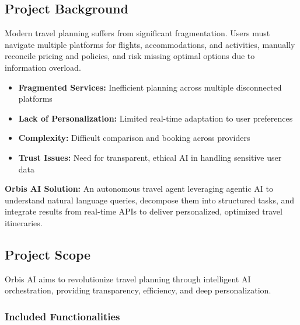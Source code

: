 \documentclass[12pt,a4paper]{article}
\begin{document}
\subsection{Project Background}

Modern travel planning suffers from significant fragmentation. Users must navigate multiple platforms for flights, accommodations, and activities, manually reconcile pricing and policies, and risk missing optimal options due to information overload.

\begin{infobox}
\begin{itemize}[leftmargin=*, itemsep=0.3em]
    \item \textbf{Fragmented Services:} Inefficient planning across multiple disconnected platforms
    \item \textbf{Lack of Personalization:} Limited real-time adaptation to user preferences
    \item \textbf{Complexity:} Difficult comparison and booking across providers
    \item \textbf{Trust Issues:} Need for transparent, ethical AI in handling sensitive user data
\end{itemize}
\end{infobox}

\textbf{Orbis AI Solution:} An autonomous travel agent leveraging agentic AI to understand natural language queries, decompose them into structured tasks, and integrate results from real-time APIs to deliver personalized, optimized travel itineraries.
\newpage
\subsection{Project Scope}

Orbis AI aims to revolutionize travel planning through intelligent AI orchestration, providing transparency, efficiency, and deep personalization.

\subsubsection{Included Functionalities}
\end{document}
